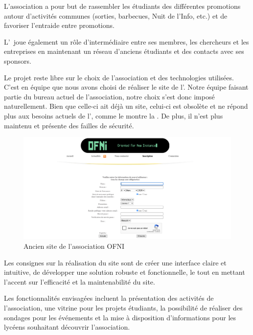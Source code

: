 L'association a pour but de rassembler les étudiants des différentes promotions autour d'activités communes (sorties, barbecues, Nuit de l'Info, etc.) et de favoriser l'entraide entre promotions.

L'\ofni\ joue également un rôle d’intermédiaire entre ses membres, les chercheurs et les entreprises en maintenant un réseau d’anciens étudiants et des contacts avec ses sponsors.
\bigskip

Le projet reste libre sur le choix de l'association et des technologies utilisées.
C'est en équipe que nous avons choisi de réaliser le site de l'\ofni. 
Notre équipe faisant partie du bureau actuel de l'association, notre choix s'est donc imposé naturellement. 
Bien que celle-ci ait déjà un site, celui-ci est obsolète et ne répond plus aux besoins actuels de l'\ofni, comme le montre la .
De plus, il n'est plus maintenu et présente des failles de sécurité.
\bigskip
\bigskip

\begin{figure}[!ht]
    \centering%
    \includegraphics[width=15cm]{assets/pictures/old-site.png}
    \caption{Ancien site de l'association OFNI}%
    \label{oldsite}%
\end{figure}
\bigskip

Les consignes sur la réalisation du site sont de créer une interface claire et intuitive, de développer une solution robuste et fonctionnelle, le tout en mettant l’accent sur l’efficacité et la maintenabilité du site.
\bigskip

Les fonctionnalités envisagées incluent la présentation des activités de l’association, une vitrine pour les projets étudiants, la possibilité de réaliser des sondages pour les événements et la mise à disposition d’informations pour les lycéens souhaitant découvrir l’association.
